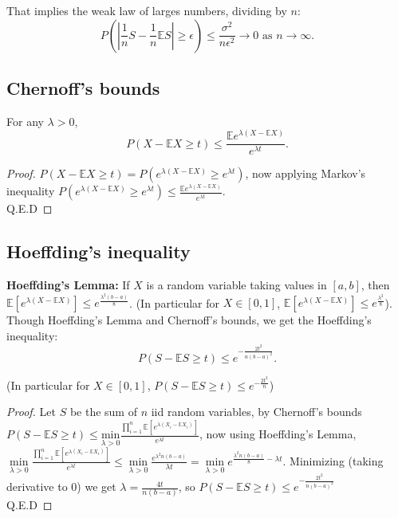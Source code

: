 \documentclass[11pt, english]{article}
\begin{document}
That implies the weak law of larges numbers, dividing by $n$:
\begin{equation}
	P(|\frac{1}{n}S-\frac{1}{n}\mathbb{E}S|\geq \epsilon)\leq\frac{\sigma^2}{n\epsilon^2}\rightarrow 0\text{ as }n\rightarrow\infty .
\end{equation} 



\subsection*{Chernoff's bounds}

For any $\lambda>0$,
\begin{equation}
	P(X-\mathbb{E}X\geq t)\leq\frac{\mathbb{E}e^{\lambda(X-\mathbb{E}X)}}{e^{\lambda t}}.
\end{equation} 
\begin{proof}
	$P(X-\mathbb{E}X\geq t)=P(e^{\lambda(X-\mathbb{E}X)}\geq e^{\lambda t})$, now applying Markov's inequality $P(e^{\lambda(X-\mathbb{E}X)}\geq e^{\lambda t})\leq \frac{\mathbb{E}e^{\lambda(X-\mathbb{E}X)}}{e^{\lambda t}}$. \\ Q.E.D
\end{proof}

\subsection*{Hoeffding's inequality}

\textbf{Hoeffding's Lemma:} If $X$ is a random variable taking values in $[a,b]$, then $\mathbb{E}[e^{\lambda(X-\mathbb{E}X)}]\leq e^{\frac{\lambda^2(b-a)}{8}}$.
(In particular for $X\in[0,1]$, $\mathbb{E}[e^{\lambda(X-\mathbb{E}X)}]\leq e^{\frac{\lambda^2}{8}}$).\\

Though Hoeffding's Lemma and Chernoff's bounds, we get the Hoeffding's inequality:
\begin{equation}
	P(S-\mathbb{E}S\geq t)\leq e^{-\frac{2t^2}{n(b-a)^2}}.
\end{equation}

(In particular for $X\in[0,1]$, $P(S-\mathbb{E}S\geq t)\leq e^{-\frac{2t^2}{n}}$)

\begin{proof}
	Let $S$ be the sum of $n$ iid random variables, by Chernoff's bounds $P(S-\mathbb{E}S\geq t)\leq \underset{\lambda>0}{\text{min}}\frac{\prod\limits_{i=1}^n \mathbb{E}[e^{\lambda(X_i-\mathbb{E}X_i)}]}{e^{\lambda t}}$, now using Hoeffding's Lemma, $\underset{\lambda>0}{\min}\frac{\prod\limits_{i=1}^n \mathbb{E}[e^{\lambda(X_i-\mathbb{E}X_i)}]}{e^{\lambda t}}\leq \underset{\lambda>0}{\min}\frac{e^{\lambda^2 n(b-a)}}{\lambda t}=\underset{\lambda>0}{\min}e^{\frac{\lambda^2n(b-a)}{8}-\lambda t}$. Minimizing (taking derivative to 0) we get $\lambda=\frac{4t}{n(b-a)}$, so $P(S-\mathbb{E}S\geq t)\leq e^{-\frac{2t^2}{n(b-a)^2}}$\\
	Q.E.D
\end{proof}
\end{document}
